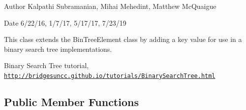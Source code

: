 \begin{DoxyAuthor}{Author}
Kalpathi Subramanian, Mihai Mehedint, Matthew Mc\+Quaigue
\end{DoxyAuthor}
\begin{DoxyDate}{Date}
6/22/16, 1/7/17, 5/17/17, 7/23/19
\end{DoxyDate}
This class extends the Bin\+Tree\+Element class by adding a \textquotesingle{}key\textquotesingle{} value for use in a binary search tree implementations.

Binary Search Tree tutorial, \href{http://bridgesuncc.github.io/tutorials/BinarySearchTree.html}{\tt http\+://bridgesuncc.\+github.\+io/tutorials/\+Binary\+Search\+Tree.\+html} \subsection*{Public Member Functions}
